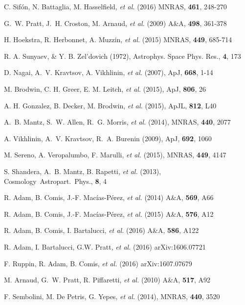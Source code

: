 \documentclass[11pt,a4paper,twoside,graphicx,color]{article}
\begin{document}
\begin{thebibliography}{9}

 {\small C. Sif{\'o}n, N. Battaglia,  M. Hasselfield, {\it et al.} (2016) MNRAS, \textbf{461}, 248-270}

 {\small G.~W. Pratt, J.~H. Croston,  M. Arnaud, {\it et al.} (2009) A\&A, \textbf{498}, 361-378}

 {\small H. Hoekstra, R. Herbonnet,  A. Muzzin, {\it et al.} (2015) MNRAS, \textbf{449}, 685-714}

  {\small R. A. Sunyaev, \& Y. B. Zel'dovich (1972), Astrophys. Space Phys. Res., \textbf{4}, 173}
  
  {\small D. Nagai, A.~V. Kravtsov, A. Vikhlinin, {\it et al.} (2007), ApJ, \textbf{668}, 1-14}
  
   {\small M. Brodwin, C. H. Greer, E. M. Leitch, {\it et al.} (2015), ApJ, \textbf{806}, 26}

  {\small A. H. Gonzalez, B. Decker, M. Brodwin, {\it et al.} (2015), ApJL, \textbf{812}, L40}
  
   {\small A.~B. Mantz, S.~W. Allen, R.~G. Morris, {\it et al.} (2014), MNRAS, \textbf{440}, 2077}
  
   {\small A. Vikhlinin, A.~V. Kravtsov, R.~A. Burenin (2009), ApJ, \textbf{692}, 1060}
  
   {\small M. Sereno, A. Veropalumbo, F. Marulli, {\it et al.} (2015), MNRAS, \textbf{449}, 4147}
  
   {\small S. Shandera, A.~B. Mantz, B. Rapetti, {\it et al.} (2013), Cosmology~Astropart.~Phys., \textbf{8}, 4}
  
   {\small R. Adam, B. Comis, J.-F. Mac\'ias-P\'erez, {\it et al.} (2014) A\&A, \textbf{569}, A66}

   {\small R. Adam, B. Comis, J.-F. Mac\'ias-P\'erez, {\it et al.} (2015) A\&A, \textbf{576}, A12}

   {\small R. Adam, B. Comis, I. Bartalucci, {\it et al.} (2016) A\&A, \textbf{586}, A122}

   {\small R. Adam, I. Bartalucci, G.W. Pratt, {\it et al.} (2016) arXiv:1606.07721}

  {\small F. Ruppin, R. Adam, B. Comis, {\it et al.} (2016) arXiv:1607.07679}

   {\small M. Arnaud, G.~W. Pratt, R. Piffaretti, {\it et al.} (2010) A\&A, \textbf{517}, A92}

   {\small F. Sembolini, M. De Petris, G. Yepes, {\it et al.} (2014), MNRAS, \textbf{440}, 3520}
  
\end{thebibliography}
\end{document}
